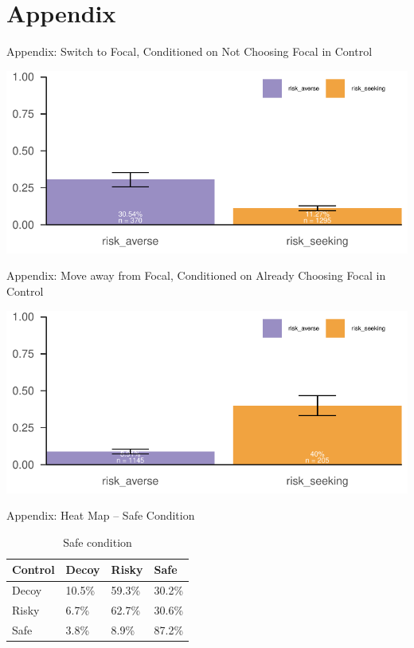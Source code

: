 \documentclass[
  ignorenonframetext,
  aspectratio=169]{beamer}
\begin{document}
\section{Appendix}\label{appendix}

\begin{frame}{Appendix: Switch to Focal, Conditioned on Not Choosing
Focal in Control}
\label{appendix-switch-to-focal-conditioned-on-not-choosing-focal-in-control}
\begin{flushright}\includegraphics{BDR_Lab_0929_files/figure-beamer/unnamed-chunk-7-1} \end{flushright}
\end{frame}

\begin{frame}{Appendix: Move away from Focal, Conditioned on Already
Choosing Focal in Control}
\label{appendix-move-away-from-focal-conditioned-on-already-choosing-focal-in-control}
\begin{flushright}\includegraphics{BDR_Lab_0929_files/figure-beamer/unnamed-chunk-8-1} \end{flushright}
\end{frame}

\begin{frame}{Appendix: Heat Map -- Safe Condition}
\label{appendix-heat-map-safe-condition}
\begin{table}
\centering
\caption{\label{tab:unnamed-chunk-9}Safe condition}
\centering
\begin{tabular}[t]{llll}
\toprule
Control & Decoy & Risky & Safe\\
\midrule
Decoy & 10.5\% & 59.3\% & 30.2\%\\
Risky & 6.7\% & 62.7\% & 30.6\%\\
Safe & 3.8\% & 8.9\% & 87.2\%\\
\bottomrule
\end{tabular}
\end{table}
\end{frame}
\end{document}
